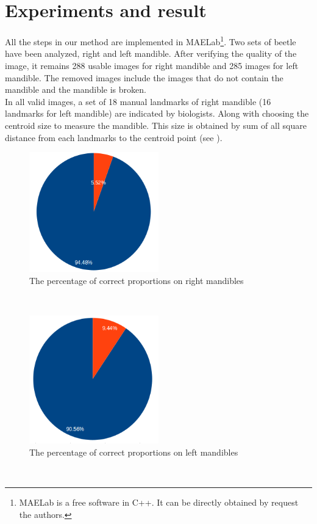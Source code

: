 \documentclass[twoside,twocolumn,10pt]{article}
\begin{document}
\section{Experiments and result}
All the steps in our method are implemented in MAELab\footnote{MAELab is a free software in C++. It can be directly obtained by request the authors.}. Two sets of beetle have been analyzed, right and left mandible. After verifying the quality of the image, it remains 288 usable images for right mandible and 285 images for left mandible. The removed images include the images that do not contain the mandible and the mandible is broken.\\
In all valid images, a set of 18 manual landmarks of right mandible (16 landmarks for left mandible) are indicated by biologists. Along with choosing the centroid size to measure the mandible. This size is obtained by sum of all square distance from each landmarks to the centroid point (see \cite{Webster}).
\begin{figure}[htb]
    \centering
    \includegraphics[width=0.5\textwidth]{./images/mdresult}
    \caption{The percentage of correct proportions on right mandibles }
    \label{figmdresult}
\end{figure}~\\
\begin{figure}[htb]
    \centering
    \includegraphics[width=0.5\textwidth]{./images/mgresult}
    \caption{The percentage of correct proportions on left mandibles }
    \label{figmgresult}
\end{figure}~\\
\end{document}
